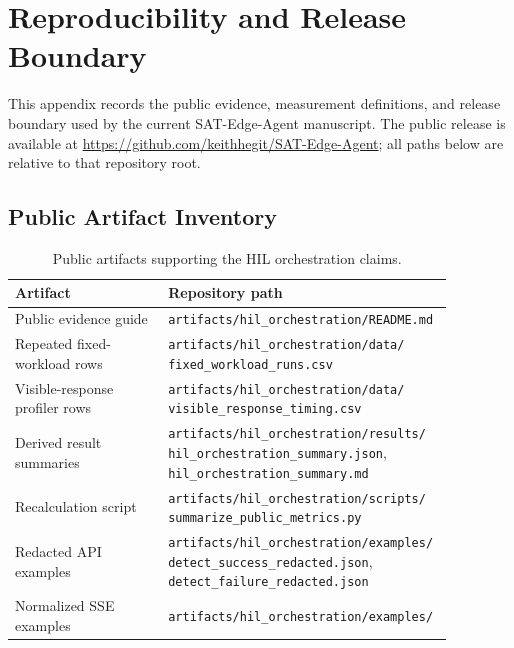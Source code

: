 
\section{Reproducibility and Release Boundary}
\label{app:artifacts}

This appendix records the public evidence, measurement definitions, and release boundary used by the current SAT-Edge-Agent manuscript. The public release is available at \url{https://github.com/keithhegit/SAT-Edge-Agent}; all paths below are relative to that repository root.

\subsection{Public Artifact Inventory}

\begin{table}[H]
\centering
\footnotesize
\renewcommand{\arraystretch}{1.15}
\setlength{\tabcolsep}{4pt}
\caption{Public artifacts supporting the HIL orchestration claims.}
\label{tab:hil_artifacts}
\begin{tabular}{p{0.34\linewidth}p{0.53\linewidth}}
\toprule
\rowcolor{gray!12}
\textbf{Artifact} & \textbf{Repository path} \\
\midrule
Public evidence guide & \texttt{artifacts/hil\_orchestration/README.md} \\
\rowcolor{graybg}
Repeated fixed-workload rows & \texttt{artifacts/hil\_orchestration/data/}
\newline\texttt{fixed\_workload\_runs.csv} \\
Visible-response profiler rows & \texttt{artifacts/hil\_orchestration/data/}
\newline\texttt{visible\_response\_timing.csv} \\
\rowcolor{graybg}
Derived result summaries & \texttt{artifacts/hil\_orchestration/results/}
\newline\texttt{hil\_orchestration\_summary.json}, \texttt{hil\_orchestration\_summary.md} \\
Recalculation script & \texttt{artifacts/hil\_orchestration/scripts/}
\newline\texttt{summarize\_public\_metrics.py} \\
\rowcolor{graybg}
Redacted API examples & \texttt{artifacts/hil\_orchestration/examples/}
\newline\texttt{detect\_success\_redacted.json}, \texttt{detect\_failure\_redacted.json} \\
Normalized SSE examples & \texttt{artifacts/hil\_orchestration/examples/}

\end{tabular}
\end{table}
